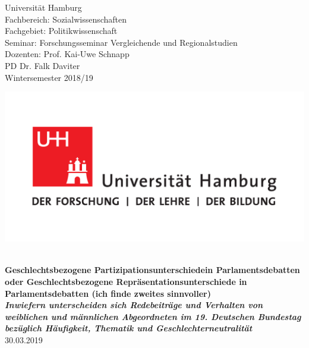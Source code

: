 \documentclass[12pt, 
    twoside=false, 
    bibliography=totoc, 
    numbers=endperiod, 
    headings=normal, 
    toc=chapterentrydotfill
    ]{scrbook}
\begin{document}
\begin{titlepage}
    \begin{minipage}[t]{0.6\textwidth}
    \flushleft 
    Universität Hamburg \\
    Fachbereich: Sozialwissenschaften \\
    Fachgebiet: Politikwissenschaft \\
    Seminar: Forschungsseminar Vergleichende und Regionalstudien \\ 
    Dozenten: Prof. Kai-Uwe Schnapp \\
    PD Dr. Falk Daviter \\
    Wintersemester 2018/19 \\
    \end{minipage}
    \hfill
    \begin{minipage}[t][1.7cm][b]{0.35\textwidth}
    \includegraphics[width=\textwidth]{images/UHH-Logo_2010_Farbe_CMYK.pdf}
    \end{minipage}
    
    \vspace*{\fill}
    \begin{center}
	\vspace{1cm} \vspace{0.2cm} \\
	\textbf{\Large Geschlechtsbezogene Partizipationsunterschiedein Parlamentsdebatten  oder Geschlechtsbezogene Repräsentationsunterschiede in Parlamentsdebatten (ich finde zweites sinnvoller) \\
	\vspace {0,5cm} \small\emph{Inwiefern unterscheiden sich Redebeiträge und Verhalten von weiblichen und männlichen Abgeordneten im 19. Deutschen Bundestag bezüglich Häufigkeit, Thematik und Geschlechterneutralität}} \\
	\vspace{0.5cm}
	30.03.2019
	\end{center}
    \vspace*{\fill}
	

\end{titlepage}
\end{document}
